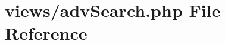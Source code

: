 \hypertarget{adv_search_8php}{}\section{views/adv\+Search.php File Reference}
\label{adv_search_8php}

